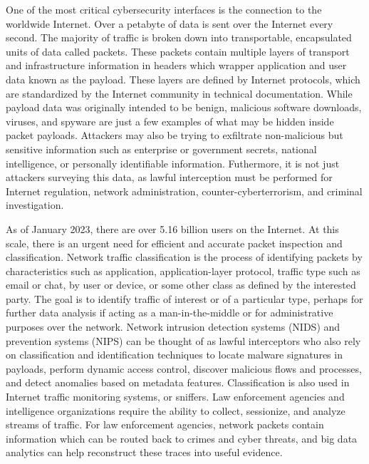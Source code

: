 One of the most critical cybersecurity interfaces is the connection to the worldwide Internet. Over a petabyte of data is sent over the Internet every second. The majority of traffic is broken down into transportable, encapsulated units of data called packets. These packets contain multiple layers of transport and infrastructure information in headers which wrapper application and user data known as the payload. These layers are defined by Internet protocols, which are standardized by the Internet community in technical documentation. While payload data was originally intended to be benign, malicious software downloads, viruses, and spyware are just a few examples of what may be hidden inside packet payloads. Attackers may also be trying to exfiltrate non-malicious but sensitive information such as enterprise or government secrets, national intelligence, or personally identifiable information. Futhermore, it is not just attackers surveying this data, as lawful interception must be performed for Internet regulation, network administration, counter-cyberterrorism, and criminal investigation.

As of January 2023, there are over 5.16 billion users on the Internet. At this scale, there is an urgent need for efficient and accurate packet inspection and classification. Network traffic classification is the process of identifying packets by characteristics such as application, application-layer protocol, traffic type such as email or chat, by user or device, or some other class as defined by the interested party. The goal is to identify traffic of interest or of a particular type, perhaps for further data analysis if acting as a man-in-the-middle or for administrative purposes over the network. Network intrusion detection systems (NIDS) and prevention systems (NIPS) can be thought of as lawful interceptors who also rely on classification and identification techniques to locate malware signatures in payloads, perform dynamic access control, discover malicious flows and processes, and detect anomalies based on metadata features. Classification is also used in Internet traffic monitoring systems, or sniffers. Law enforcement agencies and intelligence organizations require the ability to collect, sessionize, and analyze streams of traffic. For law enforcement agencies, network packets contain information which can be routed back to crimes and cyber threats, and big data analytics can help reconstruct these traces into useful evidence.

